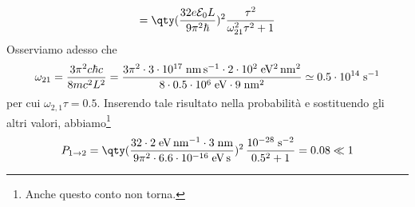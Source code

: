 \begin{soluzione}
\begin{equation*}
      =\qty( \frac{32 e \mathcal{E}_0 L}{9 \pi^2 \hbar} )^2 \frac{\tau^2}{\omega_{21}^2 \tau^2 + 1}
   \end{equation*}
   Osserviamo adesso che
   \begin{equation*}
      \omega_{21}
      =\frac{3 \pi^2 c \hbar c}{8 mc^2 L^2}
      =\frac{3 \pi^2 \cdot 3 \cdot 10^{17} \; \rm nm \, s^{-1} \cdot 2 \cdot 10^2 \; eV^2 \, nm^2}{8 \cdot 0.5 \cdot 10^6 \; \rm eV \cdot 9 \; \rm nm^2}
      \simeq 0.5 \cdot 10^{14} \; \rm s^{-1}
   \end{equation*}
   per cui $\omega_{2,1}\tau=0.5$. Inserendo tale risultato nella probabilità e sostituendo gli altri valori, abbiamo\footnote{Anche questo conto non torna.}
   \begin{equation*}
      P_{1 \to 2}
      =\rm \qty( \frac{32 \cdot 2 \; eV \, nm^{-1} \cdot 3 \; nm}{9 \pi^2 \cdot 6.6 \cdot 10^{-16} \; eV \, s} )^2 \, \frac{10^{-28} \; s^{-2}}{0.5^2 + 1}
      =0.08 \ll 1
   \end{equation*}
\end{soluzione}

\newpage
\setcounter{equation}{0}